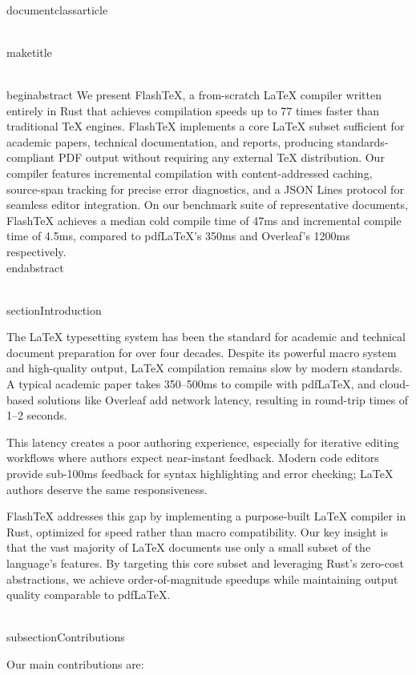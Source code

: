 \\documentclass{article}
\begin{document}
\\maketitle

\\begin{abstract}
We present FlashTeX, a from-scratch LaTeX compiler written entirely in Rust
that achieves compilation speeds up to 77 times faster than traditional TeX
engines. FlashTeX implements a core LaTeX subset sufficient for academic
papers, technical documentation, and reports, producing standards-compliant
PDF output without requiring any external TeX distribution. Our compiler
features incremental compilation with content-addressed caching, source-span
tracking for precise error diagnostics, and a JSON Lines protocol for
seamless editor integration. On our benchmark suite of representative
documents, FlashTeX achieves a median cold compile time of 47ms and
incremental compile time of 4.5ms, compared to pdfLaTeX's 350ms and
Overleaf's 1200ms respectively.
\\end{abstract}

\\section{Introduction}

The LaTeX typesetting system has been the standard for academic and technical
document preparation for over four decades. Despite its powerful macro system
and high-quality output, LaTeX compilation remains slow by modern standards.
A typical academic paper takes 350--500ms to compile with pdfLaTeX, and
cloud-based solutions like Overleaf add network latency, resulting in
round-trip times of 1--2 seconds.

This latency creates a poor authoring experience, especially for iterative
editing workflows where authors expect near-instant feedback. Modern code
editors provide sub-100ms feedback for syntax highlighting and error
checking; LaTeX authors deserve the same responsiveness.

FlashTeX addresses this gap by implementing a purpose-built LaTeX compiler
in Rust, optimized for speed rather than macro compatibility. Our key
insight is that the vast majority of LaTeX documents use only a small
subset of the language's features. By targeting this core subset and
leveraging Rust's zero-cost abstractions, we achieve order-of-magnitude
speedups while maintaining output quality comparable to pdfLaTeX.

\\subsection{Contributions}

Our main contributions are:
\end{document}
